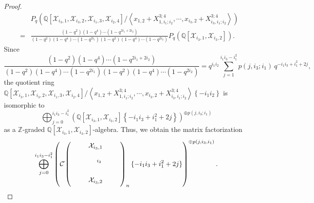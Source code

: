 \documentclass[10pt]{amsart}
\theoremstyle{break}
\begin{document}
\begin{proof}
\begin{eqnarray*}
&&P_q ({{\mathbb{Q}}} [\mathcal{X}_{i_{3},1},\mathcal{X}_{i_{3},2},\mathcal{X}_{i_{1},3},\mathcal{X}_{i_{2},4}]/\left< x_{1,2}+X^{3;4}_{1,i_1;i_2},\cdots ,x_{i_3,2}+X^{3;4}_{i_3,i_1;i_2} \right> ) \\[-0.1em]
&=&\frac{(1-q^2)(1-q^4)\cdots (1-q^{2i_1+2i_2})}{(1-q^2)(1-q^4)\cdots (1-q^{2i_1})(1-q^2)(1-q^4)\cdots (1-q^{2i_2})} P_q ({{\mathbb{Q}}} [\mathcal{X}_{i_{3},1},\mathcal{X}_{i_{3},2}]).
\end{eqnarray*}
Since
\begin{equation*}
\frac{(1-q^2)(1-q^4)\cdots (1-q^{2i_1+2i_2})}{(1-q^2)(1-q^4)\cdots (1-q^{2i_1})(1-q^2)(1-q^4)\cdots (1-q^{2i_2})}=q^{i_1 i_2}\sum_{j=1}^{i_1 i_3 -i_1^2}p(j,i_3;i_1) \ q^{-i_1 i_3+i_1^2+2j},
\end{equation*}
the quotient ring ${{\mathbb{Q}}} [\mathcal{X}_{i_{3},1},\mathcal{X}_{i_{3},2},\mathcal{X}_{i_{1},3},\mathcal{X}_{i_{2},4}]/\left< x_{1,2}+X^{3;4}_{1,i_1;i_2},\cdots ,x_{i_3,2}+X^{3;4}_{i_3,i_1;i_2} \right> \left\{ -i_1 i_2 \right\}$ is isomorphic to 
\begin{equation*}
\bigoplus_{j=0}^{i_1 i_3-i_1^2}\left( {{\mathbb{Q}}} [\mathcal{X}_{i_{3},1},\mathcal{X}_{i_{3},2}] \left\{ -i_1 i_3+i_1^2 +2j\right\} \right)^{\oplus p(j,i_3;i_1)}
\end{equation*}
as a ${{\mathbb{Z}}}$-graded ${{\mathbb{Q}}} [\mathcal{X}_{i_{3},1},\mathcal{X}_{i_{3},2}]$-algebra.
Thus, we obtain the matrix factorization
\begin{equation*}
\bigoplus_{j=0}^{i_1 i_3 -i_1^2}\left( {{\mathcal{C}}}\acute{}\left( 
\unitlength 0.1in
\begin{picture}(  10.00,  5.0000)(  -2.000,-7.0000)
\special{pn 8}\special{pa 300 900}\special{pa 300 400}\special{fp}\special{sh 1}\special{pa 300 400}\special{pa 280 468}\special{pa 300 454}\special{pa 320 468}\special{pa 300 400}\special{fp}\put(3.750000,-6.0000){\makebox(0,0){${}_{i_3}$}}\put(3.0000,-10.0000){\makebox(0,0){$\mathcal{X}_{i_3,2}$}}\put(3.0000,-3.0000){\makebox(0,0){$\mathcal{X}_{i_3,1}$}}\end{picture}
\right)_n \{ -i_1 i_3 +i_1^2 +2j \}\right)^{\oplus p(j,i_3,i_1)}.
\end{equation*}


\end{proof}
\end{document}
